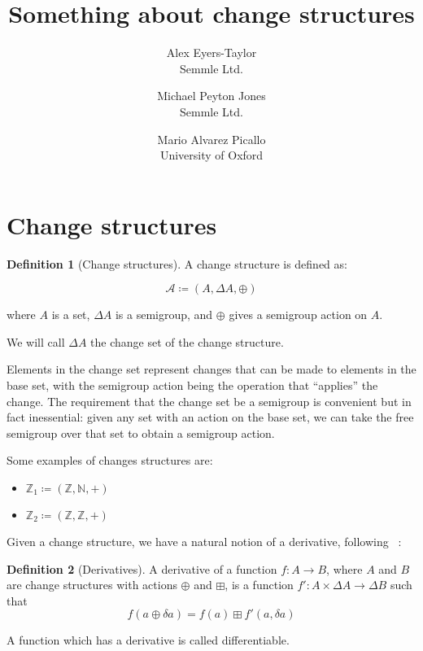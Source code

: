 \documentclass[english]{article}
\theoremstyle{plain}
\theoremstyle{definition}
\theoremstyle{remark}
\theoremstyle{remark}
\theoremstyle{remark}
\theoremstyle{definition}
\newtheorem{defn}{Definition}
\newcommand{\defeq}{\coloneqq}
\newcommand{\cplus}{\oplus}
\newcommand{\cpluss}{\boxplus}
\newcommand{\cstruct}[3]{(#1,#2,#3)}
\newcommand{\changes}[1]{\Delta #1}
\newcommand{\change}[1]{\delta #1}
\newcommand{\derive}[1]{#1'}
\begin{document}
\title{Something about change structures}

\author{
  Alex Eyers-Taylor\\
  Semmle Ltd.
  \and
  Michael Peyton Jones\\
  Semmle Ltd.
  \and
  Mario Alvarez Picallo\\
  University of Oxford
}

\maketitle

\section{Change structures}

\begin{defn}[Change structures]

  A change structure is defined as:

  $$\mathcal{A} \defeq \cstruct{A}{\changes{A}}{\cplus}$$

  where $A$ is a set, $\changes{A}$ is a semigroup, and $\cplus$ gives a semigroup action on $A$.

  We will call $\changes{A}$ the change set of the change structure.
\end{defn}

Elements in the change set represent changes that can be made to elements in the
base set, with the semigroup action being the operation that ``applies'' the
change. The requirement that the change set be a semigroup is convenient but in
fact inessential: given any set with an action on the base set, we can take the
free semigroup over that set to obtain a semigroup action.

Some examples of changes structures are:
\begin{itemize}
  \item $\mathbb{Z}_1 \defeq \cstruct{\mathbb{Z}}{\mathbb{N}}{+}$
  \item $\mathbb{Z}_2 \defeq \cstruct{\mathbb{Z}}{\mathbb{Z}}{+}$
\end{itemize}

Given a change structure, we have a natural notion of a derivative, following ~\cite{cai2014changes}:

\begin{defn}[Derivatives]
  A derivative of a function $f: A \rightarrow B$, where $A$ and $B$ are
  change structures with actions $\cplus$ and $\cpluss$, is a function $\derive{f}: A \times \changes{A} \rightarrow
  \changes{B}$ such that
  $$f(a \cplus \change{a}) = f(a) \cpluss \derive{f}(a, \change{a})$$

  A function which has a derivative is called differentiable.
\end{defn}
\end{document}
